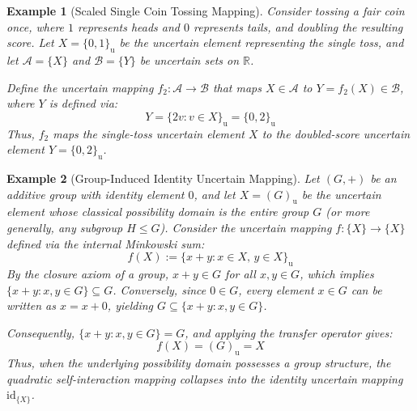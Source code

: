 \documentclass[a4paper,12pt, twoside]{memoir}
\newtheorem{example}{Example}[chapter]
\newcommand{\tbd}[1]{\mathcal{#1}} %
\newcommand{\s}[1]{\{#1\}_\mathrm{u}} %
\begin{document}
	\begin{example}[Scaled Single Coin Tossing Mapping]
		Consider tossing a fair coin once, where $1$ represents heads and $0$ represents tails, and doubling the resulting score. Let $X = \s{0, 1}$ be the uncertain element representing the single toss, and let $\tbd{A} = \{X\}$ and $\tbd{B} = \{Y\}$ be uncertain sets on $\mathbb{R}$.
		
		Define the uncertain mapping $f_2 : \tbd{A} \to \tbd{B}$ that maps $X \in \tbd{A}$ to $Y = f_2(X) \in \tbd{B}$, where $Y$ is defined via:
		\[
		Y = \s{2v : v \in X} = \s{0, 2}
		\]
		Thus, $f_2$ maps the single-toss uncertain element $X$ to the doubled-score uncertain element $Y = \s{0, 2}$.
	\end{example}
	\begin{example}[Group-Induced Identity Uncertain Mapping]
		Let $(G, +)$ be an additive group with identity element $0$, and let $X = (G)_\mathrm{u}$ be the uncertain element whose classical possibility domain is the entire group $G$ (or more generally, any subgroup $H \le G$). Consider the uncertain mapping $f : \{X\} \to \{X\}$ defined via the internal Minkowski sum:
		\[
		f(X) := \big\{ x + y : x \in X, \, y \in X \big\}_\mathrm{u}
		\]
		By the closure axiom of a group, $x + y \in G$ for all $x, y \in G$, which implies $\{x + y : x, y \in G\} \subseteq G$. Conversely, since $0 \in G$, every element $x \in G$ can be written as $x = x + 0$, yielding $G \subseteq \{x + y : x, y \in G\}$. 
		
		Consequently, $\{x + y : x, y \in G\} = G$, and applying the transfer operator gives:
		\[
		f(X) = (G)_\mathrm{u} = X
		\]
		Thus, when the underlying possibility domain possesses a group structure, the quadratic self-interaction mapping collapses into the \emph{identity uncertain mapping} $\mathrm{id}_{\{X\}}$.
	\end{example}
\end{document}
